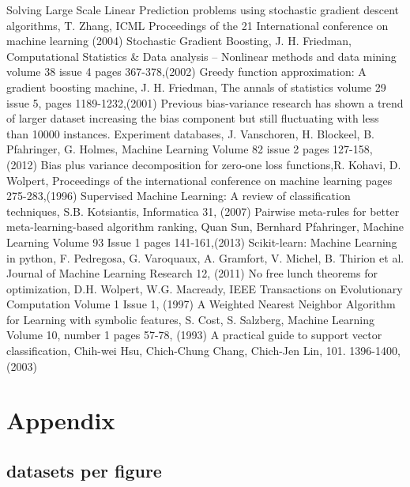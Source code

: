 \documentclass[a4paper,10pt]{article}
\begin{document}
\begin{thebibliography}{9}
 Solving Large Scale Linear Prediction problems using stochastic gradient descent algorithms, T. Zhang, ICML Proceedings of the 21 International conference on machine learning (2004)
 Stochastic Gradient Boosting, J. H. Friedman,  Computational Statistics \& Data analysis – Nonlinear methods and data mining volume 38 issue 4 pages 367-378,(2002)
 Greedy function approximation: A gradient boosting machine, J. H. Friedman, The annals of statistics volume 29 issue 5, pages 1189-1232,(2001)
Previous bias-variance research has shown a trend of larger dataset increasing the bias component but still fluctuating with  less than 10000 instances.
 Experiment databases, J. Vanschoren, H. Blockeel, B. Pfahringer, G. Holmes, Machine Learning Volume 82 issue 2 pages 127-158, (2012)
 Bias plus variance decomposition for zero-one loss functions,R. Kohavi, D. Wolpert, Proceedings of the international conference on machine learning pages 275-283,(1996)
 Supervised Machine Learning: A review of classification techniques, S.B. Kotsiantis, Informatica 31, (2007)
 Pairwise meta-rules for better meta-learning-based algorithm ranking, Quan Sun, Bernhard Pfahringer, Machine Learning Volume 93 Issue 1 pages 141-161,(2013)
 Scikit-learn: Machine Learning in python, F. Pedregosa, G. Varoquaux, A. Gramfort, V. Michel, B. Thirion et al. Journal of Machine Learning Research 12, (2011)
 No free lunch theorems for optimization, D.H. Wolpert, W.G. Macready, IEEE Transactions on Evolutionary Computation Volume 1 Issue 1, (1997)
 A Weighted Nearest Neighbor Algorithm for Learning with symbolic features, S. Cost, S. Salzberg, Machine Learning Volume 10, number 1 pages 57-78, (1993)
 A practical guide to support vector classification, Chih-wei Hsu, Chich-Chung Chang, Chich-Jen Lin, 101. 1396-1400, (2003)


 
     
\end{thebibliography}
\endgroup

\section{Appendix}
\subsection{datasets per figure}
\end{document}
